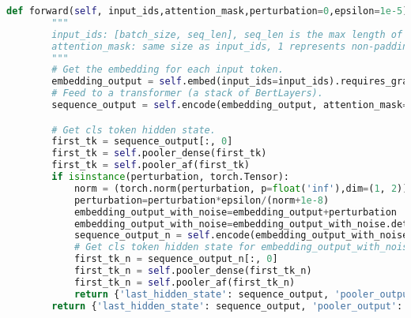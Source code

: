 \begin{lstlisting}[language=Python, caption={Changed forward method in BERTModel}, label={lst:Forw_method_BERTModel}, basicstyle=\ttfamily\small, keywordstyle=\color{blue}, commentstyle=\color{green}, stringstyle=\color{red},linewidth=\textwidth]
    def forward(self, input_ids,attention_mask,perturbation=0,epsilon=1e-5):
        """
        input_ids: [batch_size, seq_len], seq_len is the max length of the batch
        attention_mask: same size as input_ids, 1 represents non-padding tokens, 0 represents padding tokens
        """
        # Get the embedding for each input token.
        embedding_output = self.embed(input_ids=input_ids).requires_grad_()
        # Feed to a transformer (a stack of BertLayers).
        sequence_output = self.encode(embedding_output, attention_mask=attention_mask)

        # Get cls token hidden state.
        first_tk = sequence_output[:, 0]
        first_tk = self.pooler_dense(first_tk)
        first_tk = self.pooler_af(first_tk)
        if isinstance(perturbation, torch.Tensor):
            norm = (torch.norm(perturbation, p=float('inf'),dim=(1, 2))).view(perturbation.shape[0], 1, 1)
            perturbation=perturbation*epsilon/(norm+1e-8)
            embedding_output_with_noise=embedding_output+perturbation
            embedding_output_with_noise=embedding_output_with_noise.detach().requires_grad_()
            sequence_output_n = self.encode(embedding_output_with_noise, attention_mask=attention_mask)
            # Get cls token hidden state for embedding_output_with_noise.
            first_tk_n = sequence_output_n[:, 0]
            first_tk_n = self.pooler_dense(first_tk_n)
            first_tk_n = self.pooler_af(first_tk_n)
            return {'last_hidden_state': sequence_output, 'pooler_output': first_tk,'embedding_output': embedding_output,'last_hidden_state_wn': sequence_output_n, 'pooler_output_wn': first_tk_n,'embedding_output_with_noise': embedding_output_with_noise}
        return {'last_hidden_state': sequence_output, 'pooler_output': first_tk}
\end{lstlisting}

